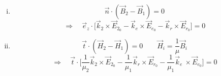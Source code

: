 {\begin{enumerate}[i)]
	\item
	\begin{equation*}
	\vec{n} \cdot (\vec{B}_2 - \vec{B}_1) = 0
	\end{equation*}
	\begin{equation*}
	\Rightarrow \quad \vec{e}_z \cdot \bigg[\vec{k}_2 \times \vec{E}_{2_0} - \vec{k}_e \times \vec{E}_{e_0} - \vec{k}_r \times \vec{E}_{r_0}\bigg] = 0
	\end{equation*}
	\item
	\begin{equation*}
	\vec{t} \cdot (\vec{H}_2 - \vec{H}_1) = 0 \qquad \vec{H}_i = \frac{1}{\mu} \vec{B}_i
	\end{equation*}
	\begin{equation*}
	\Rightarrow \quad \vec{t} \cdot \bigg[\frac{1}{\mu_2} \vec{k}_2 \times \vec{E}_{2_0} - \frac{1}{\mu_1} \vec{k}_r \times \vec{E}_{r_0} - \frac{1}{\mu_1} \vec{k}_e\ \times \vec{E}_{e_0} \bigg] = 0
	\end{equation*}
\end{enumerate}
}

